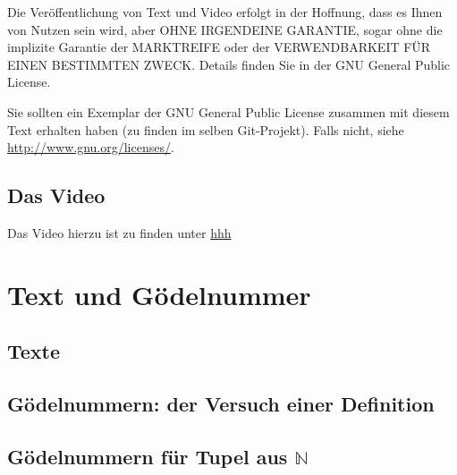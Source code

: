 \documentclass[a4paper]{amsart}
\theoremstyle{definition}
\newcommand{\N}{\ensuremath{\mathbb{ N }}}
\begin{document}
Die Veröffentlichung von Text und Video erfolgt in der Hoffnung, dass es Ihnen von Nutzen sein wird,
aber OHNE IRGENDEINE GARANTIE, sogar ohne die implizite Garantie der MARKTREIFE oder der
VERWENDBARKEIT FÜR EINEN BESTIMMTEN ZWECK. Details finden Sie in der GNU General Public License.

Sie sollten ein Exemplar der GNU General Public License zusammen mit diesem Text erhalten haben
(zu finden im selben Git-Projekt).
Falls nicht, siehe \url{http://www.gnu.org/licenses/}.

\subsection*{Das Video}
Das Video hierzu ist zu finden unter
{\tiny
   \url{hhh}
}

\section{Text und Gödelnummer}
\subsection{Texte}


\subsection{Gödelnummern: der Versuch einer Definition}


\subsection{Gödelnummern für Tupel aus $\N$}
\end{document}
